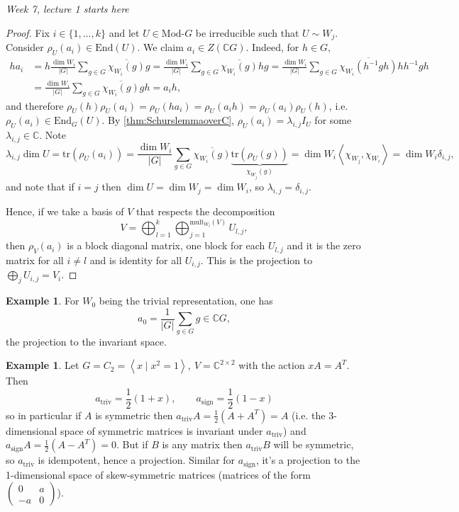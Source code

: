 \documentclass[a4paper]{article}
\newcommand{\mult}{\text{mult}}
\newcommand{\tr}{\text{tr}}
\newcommand{\la}{\left\langle}
\newcommand{\ra}{\right\rangle}
\newcommand{\C}{\mathbb{C}}
\newcommand{\End}{\text{End}}
\newcommand{\Mod}{\text{Mod-}}
\theoremstyle{definition}
\newtheorem{example}[defn]{Example}
\begin{document}
\begin{flushright}
\textit{Week 7, lecture 1 starts here}
\end{flushright}

\begin{proof}
Fix $i\in\{1,\ldots,k\}$ and let $U\in\Mod G$ be irreducible such that $U\sim W_j$. Consider $\rho_U(a_i)\in\End(U)$. We claim $a_i\in Z(\C G)$. Indeed, for $h\in G,$
\[
\begin{aligned}
ha_i&=h\frac{\dim W_i}{|G|}\sum_{g\in G}\overline{\chi_{W_i}(g)}g=\frac{\dim W_i}{|G|}\sum_{g\in G}\overline{\chi_{W_i}(g)}hg=\frac{\dim W_i}{|G|}\sum_{g\in G}\overline{\chi_{W_i}(h^{-1}gh)}hh^{-1}gh\\
&=\frac{\dim W_i}{|G|}\sum_{g\in G}\overline{\chi_{W_i}(g)}gh=a_ih,
\end{aligned}
\]
and therefore $\rho_U(h)\rho_U(a_i)=\rho_U(ha_i)=\rho_U(a_ih)=\rho_U(a_i)\rho_U(h)$, i.e. $\rho_U(a_i)\in\End_G(U)$. By \ref{thm:SchurslemmaoverC}, $\rho_U(a_i)=\lambda_{i,j}I_U$ for some $\lambda_{i,j}\in\C$. Note
\[
\lambda_{i,j}\dim U=\tr(\rho_U(a_i))=\frac{\dim W_i}{|G|}\sum_{g\in G}\overline{\chi_{W_i}(g)}\underbrace{\tr(\rho_U(g))}_{\chi_{W_j}(g)}=\dim W_i\la \chi_{W_j},\chi_{W_i}\ra=\dim W_i\delta_{i,j},
\]
and note that if $i=j$ then $\dim U=\dim W_j=\dim W_i$, so $\lambda_{i,j}=\delta_{i,j}$.

Hence, if we take a basis of $V$ that respects the decomposition
\[
V=\bigoplus_{l=1}^k\bigoplus_{j=1}^{\mult_{W_l}(V)} U_{l,j},
\]
then $\rho_V(a_i)$ is a block diagonal matrix, one block for each $U_{l,j}$ and it is the zero matrix for all $i\neq l$ and is identity for all $U_{i,j}$. This is the projection to $\bigoplus_j U_{i,j}=V_i$.
\end{proof}

\begin{example}
For $W_0$ being the trivial representation, one has
\[
a_0=\frac{1}{|G|}\sum_{g\in G}g\in\C G,
\]
the projection to the invariant space.
\end{example}
\begin{example}
Let $G=C_2=\la x\mid x^2=1\ra,\ V=\C^{2\times 2}$ with the action $xA=A^T$. Then
\[
a_{\text{triv}}=\frac12(1+x),\qquad a_{\text{sign}}=\frac12(1-x)
\]
so in particular if $A$ is symmetric then $a_{\text{triv}}A=\frac12\left(A+A^T\right)=A$ (i.e. the 3-dimensional space of symmetric matrices is invariant under $a_\text{triv}$) and $a_{\text{sign}}A=\frac12\left(A-A^T\right)=0$. But if $B$ is any matrix then $a_{\text{triv}}B$ will be symmetric, so $a_{\text{triv}}$ is idempotent, hence a projection. Similar for $a_\text{sign}$, it's a projection to the 1-dimensional space of skew-symmetric matrices (matrices of the form $\begin{pmatrix}0&a\\-a&0\end{pmatrix}$).
\end{example}
\end{document}
